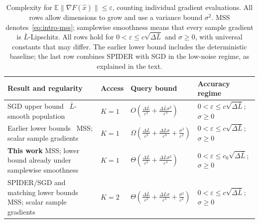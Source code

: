 \documentclass[11pt]{article}
\newcommand{\E}{\mathbb E}
\newcommand{\eps}{\varepsilon}
\theoremstyle{definition}
\theoremstyle{remark}
\begin{document}
\begin{table}[t]
\centering
\small
\renewcommand{\arraystretch}{1.35}
\setlength{\tabcolsep}{4pt}
\caption{Complexity for $\E\|\nabla F(\widehat x)\|\le\eps$, counting
individual gradient evaluations. All rows allow dimensions to grow and use
a variance bound $\sigma^2$. MSS denotes~\eqref{eq:intro-mss}; samplewise
smoothness means that every sample gradient is $\bar L$-Lipschitz. All rows
hold for $0<\eps\le c\sqrt{\Delta\bar L}$ and $\sigma\ge0$, with universal
constants that may differ. The earlier lower bound includes the
deterministic baseline; the last row combines SPIDER with SGD in the
low-noise regime, as explained in the text.}
\label{tab:comparison}
\begin{tabularx}{\textwidth}{@{}>{\raggedright\arraybackslash}p{}
 >{\centering\arraybackslash}p{}
 >{\centering\arraybackslash}p{}
 >{\raggedright\arraybackslash}X@{}}
\toprule
Result and regularity & Access & Query bound & Accuracy regime\\
\midrule
SGD upper bound~\cite{ghadimi}\newline
$\bar L$-smooth population
 & $K=1$
 & $\displaystyle O\!\left(\frac{\Delta\bar L}{\eps^2}
             +\frac{\Delta\bar L\sigma^2}{\eps^4}\right)$
 & $0<\eps\le c\sqrt{\Delta\bar L}$; $\sigma\ge0$\\[4pt]
Earlier lower bounds~\cite{arjevani,carmon}\newline
MSS; scalar sample gradients
 & $K=1$
 & $\displaystyle\Omega\!\left(\frac{\Delta\bar L}{\eps^2}
                   +\frac{\Delta\bar L\sigma}{\eps^3}
                   +\frac{\sigma^2}{\eps^2}\right)$
 & $0<\eps\le c\sqrt{\Delta\bar L}$; $\sigma\ge0$\\[4pt]
\textbf{This work}\newline
MSS; lower bound already under samplewise smoothness
 & $K=1$
 & $\displaystyle\Theta\!\left(\frac{\Delta\bar L}{\eps^2}
                  +\frac{\Delta\bar L\sigma^2}{\eps^4}\right)$
 & $0<\eps\le c_0\sqrt{\Delta\bar L}$; $\sigma\ge0$\\[4pt]
SPIDER/SGD and matching lower bounds~\cite{spider,ghadimi,arjevani,carmon}\newline
MSS; scalar sample gradients
 & $K=2$
 & $\displaystyle\Theta\!\left(\frac{\Delta\bar L}{\eps^2}
                   +\frac{\Delta\bar L\sigma}{\eps^3}
                   +\frac{\sigma^2}{\eps^2}\right)$
 & $0<\eps\le c\sqrt{\Delta\bar L}$; $\sigma\ge0$\\
\bottomrule
\end{tabularx}
\end{table}
\end{document}

